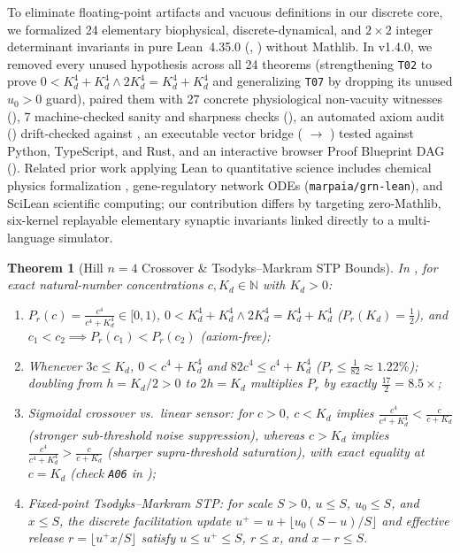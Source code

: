 \documentclass[11pt,letterpaper]{amsart}
\newtheorem{theorem}{Theorem}[section]
\begin{document}
To eliminate floating-point artifacts and vacuous definitions in our discrete core, we formalized 24 elementary biophysical, discrete-dynamical, and $2\times 2$ integer determinant invariants in pure Lean~4.35.0 (, ) without Mathlib. In v1.4.0, we removed every unused hypothesis across all 24 theorems (strengthening \texttt{T02} to prove $0 < K_d^4 + K_d^4 \wedge 2 K_d^4 = K_d^4 + K_d^4$ and generalizing \texttt{T07} by dropping its unused $u_0 > 0$ guard), paired them with 27 concrete physiological non-vacuity witnesses (), 7 machine-checked sanity and sharpness checks (), an automated axiom audit () drift-checked against , an executable vector bridge ( $\to$ ) tested against Python, TypeScript, and Rust, and an interactive browser Proof Blueprint DAG (). Related prior work applying Lean to quantitative science includes chemical physics formalization \cite{bobbin2024lean}, gene-regulatory network ODEs (\texttt{marpaia/grn-lean}), and SciLean scientific computing; our contribution differs by targeting zero-Mathlib, six-kernel replayable elementary synaptic invariants linked directly to a multi-language simulator.

\begin{theorem}[Hill $n=4$ Crossover \& Tsodyks--Markram STP Bounds]
In , for exact natural-number concentrations $c, K_d \in \mathbb{N}$ with $K_d > 0$:
\begin{enumerate}
  \item $P_r(c) = \frac{c^4}{c^4 + K_d^4} \in [0,1)$, $0 < K_d^4 + K_d^4 \wedge 2 K_d^4 = K_d^4 + K_d^4$ ($P_r(K_d) = \frac{1}{2}$), and $c_1 < c_2 \implies P_r(c_1) < P_r(c_2)$ (axiom-free);
  \item Whenever $3c \le K_d$, $0 < c^4 + K_d^4$ and $82c^4 \le c^4 + K_d^4$ ($P_r \le \frac{1}{82} \approx 1.22\%$); doubling from $h = K_d/2 > 0$ to $2h = K_d$ multiplies $P_r$ by exactly $\frac{17}{2} = 8.5\times$;
  \item \emph{Sigmoidal crossover vs.\ linear sensor:} for $c > 0$, $c < K_d$ implies $\frac{c^4}{c^4 + K_d^4} < \frac{c}{c + K_d}$ (stronger sub-threshold noise suppression), whereas $c > K_d$ implies $\frac{c^4}{c^4 + K_d^4} > \frac{c}{c + K_d}$ (sharper supra-threshold saturation), with exact equality at $c = K_d$ (check \texttt{A06} in );
  \item \emph{Fixed-point Tsodyks--Markram STP:} for scale $S > 0$, $u \le S$, $u_0 \le S$, and $x \le S$, the discrete facilitation update $u^+ = u + \lfloor u_0(S-u)/S \rfloor$ and effective release $r = \lfloor u^+ x / S \rfloor$ satisfy $u \le u^+ \le S$, $r \le x$, and $x - r \le S$.
\end{enumerate}
\end{theorem}
\end{document}
